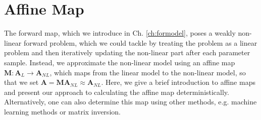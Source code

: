 

\section{Affine Map}
\label{sec:affine}
The forward map, which we introduce in Ch. \ref{ch:formodel}, poses a weakly non-linear forward problem, which we could tackle by treating the problem as a linear problem and then iteratively updating the non-linear part after each parameter sample.
Instead, we approximate the non-linear model using an affine map $ \bm{M}:\bm{A}_L \rightarrow \bm{A}_{NL}$, which maps from the linear model to the non-linear model, so that we set $ \bm{A} = \bm{M} \bm{A}_{NL} \approx \bm{A}_{NL} $.
Here, we give a brief introduction to affine maps and present our approach to calculating the affine map deterministically. 
Alternatively, one can also determine this map using other methods, e.g. machine learning methods or matrix inversion.


